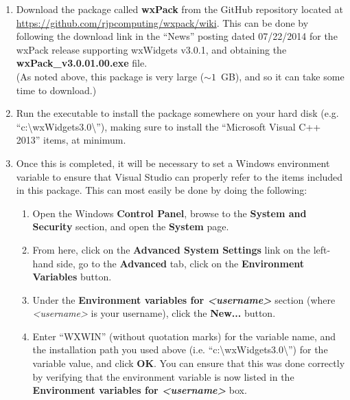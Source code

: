 \documentclass[12pt]{report}
\begin{document}
\begin{enumerate}
	\item Download the package called {\bf wxPack} from the GitHub repository located at \url{https://github.com/rjpcomputing/wxpack/wiki}. This can be done by following the download link in the ``News'' posting dated 07/22/2014 for the wxPack release supporting wxWidgets v3.0.1, and obtaining the \\
	{\bf wxPack\_v3.0.01.00.exe} file. \\(As noted above, this package is very large ($\sim1$~GB), and so it can take some time to download.)
	\item Run the executable to install the package somewhere on your hard disk (e.g. ``c:\textbackslash wxWidgets3.0\textbackslash''), making sure to install the ``Microsoft Visual C++ 2013'' items, at minimum. 
	\item Once this is completed, it will be necessary to set a Windows environment variable to ensure that Visual Studio can properly refer to the items included in this package. This can most easily be done by doing the following:
	\begin{enumerate}
		\item Open the Windows {\bf Control Panel}, browse to the {\bf System and Security} section, and open the {\bf System} page.
		\item From here, click on the {\bf Advanced System Settings} link on the left-hand side, go to the {\bf Advanced} tab, click on the {\bf Environment Variables} button.
		\item Under the {\bf Environment variables for {\em \textless username\textgreater}} section (where {\em \textless username\textgreater} is your username), click the {\bf New...} button.
		\item Enter ``WXWIN'' (without quotation marks) for the variable name, and the installation path you used above (i.e. ``c:\textbackslash wxWidgets3.0\textbackslash'') for the variable value, and click {\bf OK}. You can ensure that this was done correctly by verifying that the environment variable is now listed in the {\bf Environment variables for {\em \textless username\textgreater}} box.
	\end{enumerate}
\end{enumerate}
\end{document}
